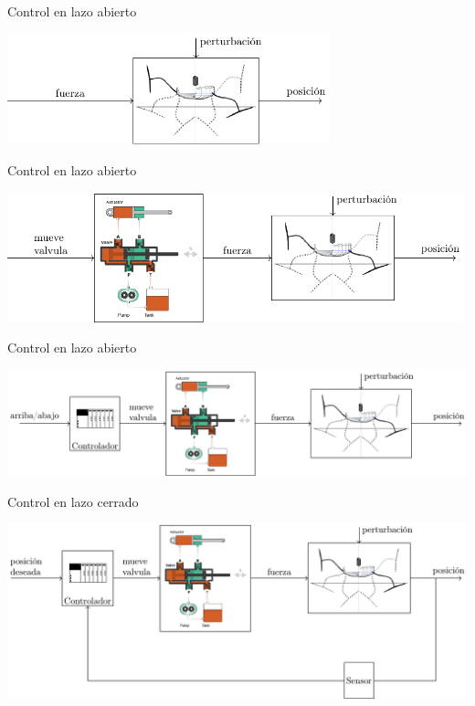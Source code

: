 \documentclass[presentation,aspectratio=169]{beamer}
\begin{document}
\begin{frame}[label={sec:org2cd7a65}]{Control en lazo abierto}
\begin{center}
\includegraphics[width=0.7\textwidth]{../../figures/ac75-control-no-actuator}
\end{center}
\end{frame}

\begin{frame}[label={sec:org985a671}]{Control en lazo abierto}
\begin{center}
\includegraphics[width=0.99\textwidth]{../../figures/ac75-control-no-control}
\end{center}
\end{frame}

\begin{frame}[label={sec:org3e0c2a1}]{Control en lazo abierto}
\begin{center}
\includegraphics[width=1.0\textwidth]{../../figures/ac75-control-block}
\end{center}
\end{frame}

\begin{frame}[label={sec:org5c0a2a4}]{Control en lazo cerrado}
\begin{center}
\includegraphics[width=1.0\textwidth]{../../figures/ac75-control-block-feedback}
\end{center}
\end{frame}
\end{document}
